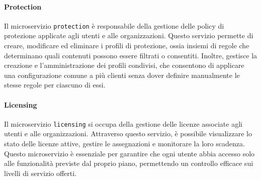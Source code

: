 \paragraph{Protection}
Il microservizio \texttt{protection} è responsabile della gestione delle policy di protezione applicate agli utenti e alle organizzazioni. Questo servizio permette di creare, modificare ed eliminare i profili di protezione, ossia insiemi di regole che determinano quali contenuti possono essere filtrati o consentiti.
Inoltre, gestisce la creazione e l’amministrazione dei profili condivisi, che consentono di applicare una configurazione comune a più clienti senza dover definire manualmente le stesse regole per ciascuno di essi.

\paragraph{Licensing}
Il microservizio \texttt{licensing} si occupa della gestione delle licenze associate agli utenti e alle organizzazioni. Attraverso questo servizio, è possibile visualizzare lo stato delle licenze attive, gestire le assegnazioni e monitorare la loro scadenza.
Questo microservizio è essenziale per garantire che ogni utente abbia accesso solo alle funzionalità previste dal proprio piano, permettendo un controllo efficace sui livelli di servizio offerti.

